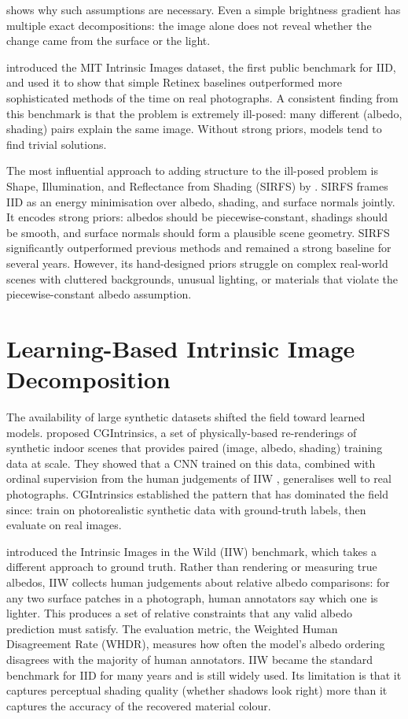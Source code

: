 shows why such assumptions are necessary. Even a
simple brightness gradient has multiple exact decompositions: the image alone
does not reveal whether the change came from the surface or the light.


 introduced the MIT Intrinsic Images dataset,
the first public benchmark for IID, and used it to show that simple Retinex
baselines outperformed more sophisticated methods of the time on real photographs.
A consistent finding from this benchmark is that the problem is extremely
ill-posed: many different (albedo, shading) pairs explain the same image.
Without strong priors, models tend to find trivial solutions.

The most influential approach to adding structure to the ill-posed problem is
Shape, Illumination, and Reflectance from Shading (SIRFS) by
.
SIRFS frames IID as an energy minimisation over albedo, shading, and surface
normals jointly.
It encodes strong priors: albedos should be piecewise-constant, shadings should be
smooth, and surface normals should form a plausible scene geometry.
SIRFS significantly outperformed previous methods and remained a strong baseline
for several years.
However, its hand-designed priors struggle on complex real-world scenes with
cluttered backgrounds, unusual lighting, or materials that violate the
piecewise-constant albedo assumption.


\section{Learning-Based Intrinsic Image Decomposition}
\label{sec:learning_iid}

The availability of large synthetic datasets shifted the field toward learned models.
 proposed CGIntrinsics, a set of physically-based
re-renderings of synthetic indoor scenes that provides paired
(image, albedo, shading) training data at scale.
They showed that a CNN trained on this data, combined with ordinal supervision
from the human judgements of IIW , generalises well to real
photographs.
CGIntrinsics established the pattern that has dominated the field since:
train on photorealistic synthetic data with ground-truth labels, then evaluate
on real images.

 introduced the Intrinsic Images in the Wild (IIW) benchmark,
which takes a different approach to ground truth.
Rather than rendering or measuring true albedos, IIW collects human judgements about
relative albedo comparisons: for any two surface patches in a photograph, human
annotators say which one is lighter.
This produces a set of relative constraints that any valid albedo prediction must
satisfy.
The evaluation metric, the Weighted Human Disagreement Rate (WHDR), measures how
often the model's albedo ordering disagrees with the majority of human annotators.
IIW became the standard benchmark for IID for many years and is still widely used.
Its limitation is that it captures perceptual shading quality (whether shadows look
right) more than it captures the accuracy of the recovered material colour.

